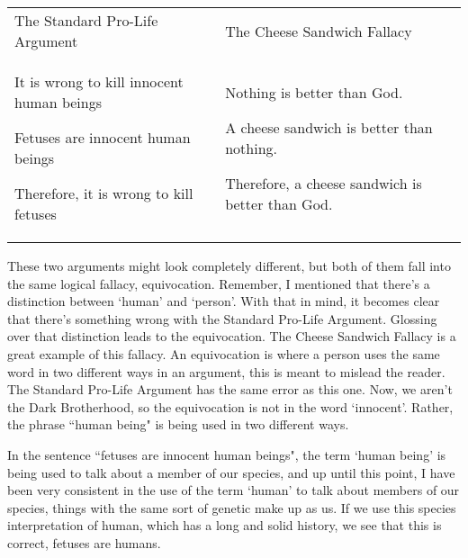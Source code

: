 \noindent
\begin{tabular}{p{2.75in}|p{2.75in}}
The Standard Pro-Life Argument&The Cheese Sandwich Fallacy\\
\begin{earg}
    \item[] It is wrong to kill innocent human beings
    \item[] Fetuses are innocent human beings
    \item[] Therefore, it is wrong to kill fetuses
\end{earg}&
\begin{earg}
    \item[] Nothing is better than God.
    \item[] A cheese sandwich is better than nothing.
    \item[] Therefore, a cheese sandwich is better than God. 
\end{earg}
\end{tabular}
These two arguments might look completely different, but both of them fall into the same logical fallacy, equivocation. Remember, I mentioned that there's a distinction between `human' and `person'. With that in mind, it becomes clear that there's something wrong with the Standard Pro-Life Argument. Glossing over that distinction leads to the equivocation. The Cheese Sandwich Fallacy is a great example of this fallacy. An equivocation is where a person uses the same word in two different ways in an argument, this is meant to mislead the reader.  The Standard Pro-Life Argument has the same error as this one. Now, we aren't the Dark Brotherhood, so the equivocation is not in the word `innocent'. Rather, the phrase ``human being" is being used in two different ways.

In the sentence ``fetuses are innocent human beings", the term `human being' is being used to talk about a member of our species, and up until this point, I have been very consistent in the use of the term `human' to talk about members of our species, things with the same sort of genetic make up as us. If we use this species interpretation of human, which has a long and solid history, we see that this is correct, fetuses are humans.

